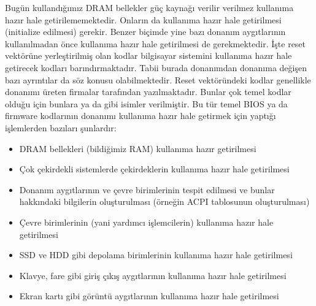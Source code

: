 \documentclass[a4paper,10pt,turkish]{sphinxmanual}
\begin{document}
\sphinxAtStartPar
Bugün kullandığımız DRAM bellekler güç kaynağı verilir verilmez kullanıma hazır hale getirilememektedir. Onların da
kullanıma hazır hale getirilmesi (initialize edilmesi) gerekir. Benzer biçimde yine bazı donanım aygıtlarının
kullanılmadan önce kullanıma hazır hale getirilmesi de gerekmektedir. İşte reset vektörüne yerleştirilmiş olan
kodlar bilgisayar sistemini kullanıma hazır hale getirecek kodları barındırmaktadır. Tabii burada donanımdan
donanıma değişen bazı ayrıntılar da söz konusu olabilmektedir. Reset vektöründeki kodlar genellikle donanımı üreten
firmalar tarafından yazılmaktadır. Bunlar çok temel kodlar olduğu için bunlara  ya da  gibi isimler
verilmiştir. Bu tür temel BIOS ya da firmware kodlarının donanımı kullanıma hazır hale getirmek için yaptığı
işlemlerden bazıları şunlardır:
\begin{itemize}
\item {} 
\sphinxAtStartPar
DRAM bellekleri (bildiğimiz RAM) kullanıma hazır getirilmesi

\item {} 
\sphinxAtStartPar
Çok çekirdekli sistemlerde çekirdeklerin kullanıma hazır hale getirilmesi

\item {} 
\sphinxAtStartPar
Donanım aygıtlarının ve çevre birimlerinin tespit edilmesi ve bunlar hakkındaki bilgilerin oluşturulması
(örneğin ACPI tablosunun oluşturulması)

\item {} 
\sphinxAtStartPar
Çevre birimlerinin (yani yardımcı işlemcilerin) kullanıma hazır hale getirilmesi

\item {} 
\sphinxAtStartPar
SSD ve HDD gibi depolama birimlerinin kullanıma hazır hale getirilmesi

\item {} 
\sphinxAtStartPar
Klavye, fare gibi giriş çıkış aygıtlarının kullanıma hazır hale getirilmesi

\item {} 
\sphinxAtStartPar
Ekran kartı gibi görüntü aygıtlarının kullanıma hazır hale getirilmesi

\end{itemize}
\end{document}
